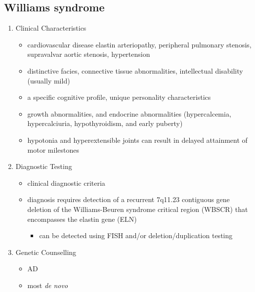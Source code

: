 \documentclass[12pt]{scrartcl}
\begin{document}
\subsection{Williams syndrome}
\label{sec:orgac552a9}
\begin{enumerate}
\item Clinical Characteristics
\label{sec:orgd980373}
\begin{itemize}
\item cardiovascular disease elastin arteriopathy, peripheral pulmonary
stenosis, supravalvar aortic stenosis, hypertension
\item distinctive facies, connective tissue abnormalities, intellectual
disability (usually mild)
\item a specific cognitive profile, unique personality characteristics
\item growth abnormalities, and endocrine abnormalities (hypercalcemia,
hypercalciuria, hypothyroidism, and early puberty)
\item hypotonia and hyperextensible joints can result in delayed
attainment of motor milestones
\end{itemize}

\item Diagnostic Testing
\label{sec:orgf5355d5}
\begin{itemize}
\item clinical diagnostic criteria
\item diagnosis requires detection of a recurrent 7q11.23 contiguous gene deletion of the Williams-Beuren syndrome critical region (WBSCR) that encompasses the elastin gene (ELN)
\begin{itemize}
\item can be detected using FISH and/or deletion/duplication testing
\end{itemize}
\end{itemize}
\item Genetic Counselling
\label{sec:org0604d15}
\begin{itemize}
\item AD
\item most \emph{de novo}
\end{itemize}
\end{enumerate}
\end{document}

